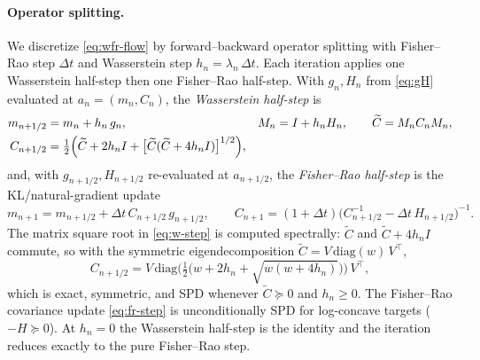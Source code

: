 \documentclass[11pt]{article}
\begin{document}
\paragraph{Operator splitting.}
We discretize \eqref{eq:wfr-flow} by forward--backward operator splitting with
Fisher--Rao step $\Delta t$ and Wasserstein step $h_n=\lambda_n\,\Delta t$. Each
iteration applies one Wasserstein half-step then one Fisher--Rao half-step.
With $g_n,H_n$ from \eqref{eq:gH} evaluated at $a_n=(m_n,C_n)$, the
\emph{Wasserstein half-step} is
\begin{align}
\label{eq:w-step}
m_{n+1/2} &= m_n + h_n\,g_n, &
M_n &= I + h_n H_n, \qquad \widetilde C = M_n C_n M_n, \notag\\
C_{n+1/2} &= \tfrac12\Big(\widetilde C + 2h_n I
+ \big[\widetilde C(\widetilde C + 4h_n I)\big]^{1/2}\Big),
\end{align}
and, with $g_{n+1/2},H_{n+1/2}$ re-evaluated at $a_{n+1/2}$, the
\emph{Fisher--Rao half-step} is the KL/natural-gradient update
\begin{equation}
\label{eq:fr-step}
m_{n+1} = m_{n+1/2} + \Delta t\,C_{n+1/2}\,g_{n+1/2}, \qquad
C_{n+1} = (1+\Delta t)\big(C_{n+1/2}^{-1} - \Delta t\,H_{n+1/2}\big)^{-1}.
\end{equation}
The matrix square root in \eqref{eq:w-step} is computed spectrally: $\widetilde
C$ and $\widetilde C+4h_nI$ commute, so with the symmetric eigendecomposition
$\widetilde C=V\,\mathrm{diag}(w)\,V^\top$,
\begin{equation}
C_{n+1/2} = V\,\mathrm{diag}\!\Big(\tfrac12\big(w + 2h_n
+ \sqrt{w(w+4h_n)}\big)\Big)\,V^\top,
\end{equation}
which is exact, symmetric, and SPD whenever $\widetilde C\succeq 0$ and
$h_n\ge 0$. The Fisher--Rao covariance update \eqref{eq:fr-step} is
unconditionally SPD for log-concave targets ($-H\succeq0$). At $h_n=0$ the
Wasserstein half-step is the identity and the iteration reduces exactly to the
pure Fisher--Rao step.
\end{document}

